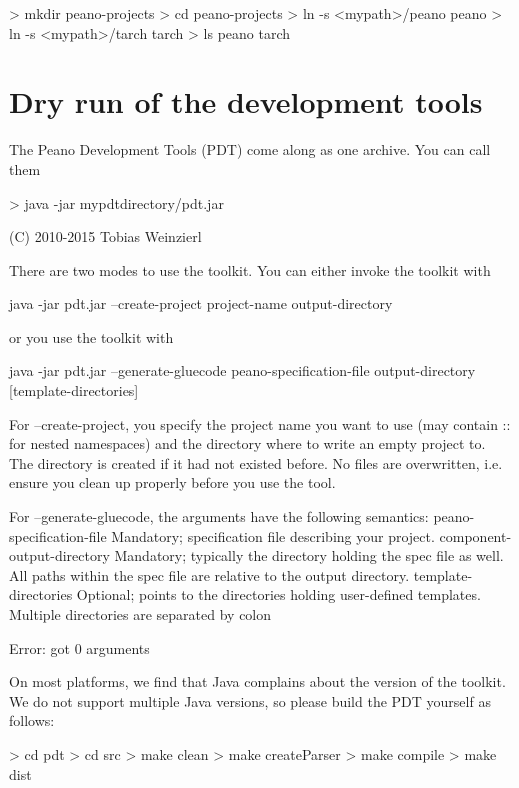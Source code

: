 \begin{code}
> mkdir peano-projects
> cd peano-projects
> ln -s <mypath>/peano peano
> ln -s <mypath>/tarch tarch
> ls
  peano   tarch
\end{code}


\section{Dry run of the development tools}

The Peano Development Tools (PDT) come along as one archive. You can call them
\begin{code}
> java -jar mypdtdirectory/pdt.jar
 
 (C) 2010-2015 Tobias Weinzierl

There are two modes to use the toolkit. You can either invoke the toolkit with

    java -jar pdt.jar --create-project project-name output-directory

or you use the toolkit with

    java -jar pdt.jar --generate-gluecode peano-specification-file output-directory 
      [template-directories]


For --create-project, you specify the project name you want to use (may contain :: for nested 
namespaces) and the directory where to write an empty project to. The directory is created if 
it had not existed before. No files are overwritten, i.e. ensure you clean up properly before
you use the tool.

For --generate-gluecode, the arguments have the following semantics:
  peano-specification-file    Mandatory; specification file describing your project. 
  component-output-directory  Mandatory; typically the directory holding the spec file as well. 
                              All paths within the spec file are relative to the output directory.
  template-directories        Optional; points to the directories holding user-defined templates. 
                              Multiple directories are separated by colon

Error: got 0 arguments
\end{code}

\noindent
On most platforms, we find that Java complains about the version of the toolkit.
We do not support multiple Java versions, so please build the PDT yourself as
follows:


\begin{code}
> cd pdt
> cd src
> make clean
> make createParser
> make compile
> make dist
\end{code}

